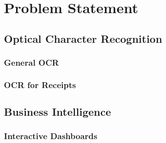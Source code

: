 \chapter{Problem Statement}
\label{chap:statement}
\section{Optical Character Recognition}
\subsection{General OCR}
\subsection{OCR for Receipts}

\section{Business Intelligence}
\subsection{Interactive Dashboards}
